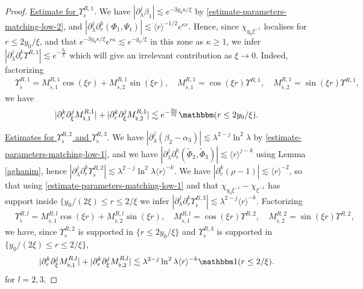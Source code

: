 \documentclass[11 pt]{amsart}
\theoremstyle{definition}
\theoremstyle{remark}
\numberwithin{equation}{section}
\begin{document}
\begin{proof}
\noindent \underline{Estimate for $\Upsilon_\flat^{R,1}$}. We have $|\partial_\lambda^j \beta_1 |\lesssim e^{- 3y_0\kappa /\xi}$ by \eqref{estimate-parameters-matching-low-2}, and $|\partial_\lambda^j \partial_r^k (\Phi_1,\Psi_1)|\lesssim \langle r \rangle^{-1/2}e^{\kappa r}$. Hence, since $\chi_{y_0\xi^{-1}}$ localises for $r\leq 2y_0/\xi$, and that $e^{-3y_0\kappa/\xi}e^{r\kappa}\lesssim e^{-y_0/\xi}$ in this zone as $\kappa\geq 1$, we infer $ \left|\partial_\lambda^j \partial_r^k \Upsilon^{R,1}\right|\lesssim e^{-\frac{y_0}{\xi}} $ which will give an irrelevant contribution as $\xi\to 0$. Indeed, factorizing
\begin{align*}
& \Upsilon^{R,1}_\flat=M^{R,1}_{\flat,1}\cos(\xi r)+M^{R,1}_{\flat,2}\sin(\xi r) , \quad M^{R,1}_{\flat,1}= \cos(\xi r)\Upsilon^{R,1}, \quad M^{R,1}_{\flat,2}= \sin(\xi r)\Upsilon^{R,1}, 
\end{align*}
we have
\begin{equation} \label{bd:mflat-inter-1}
|\partial_r^k \partial_\xi^j M^{R,1}_{\flat,1}|+|\partial_r^k \partial_\xi^j M^{R,1}_{\flat,2}|\lesssim e^{-\frac{y_0}{2\xi}}\mathbbm (r\leq 2y_0/\xi).
\end{equation}

\smallskip
     
\noindent \underline{Estimates for $\Upsilon_\flat^{R,2}$ and $\Upsilon_\flat^{R,3}$}. We have $|\partial_\lambda^j (\beta_2-\alpha_3) |\lesssim \lambda^{2-j} \ln^2 \lambda$ by \eqref{estimate-parameters-matching-low-1}, and we have $|\partial_\lambda^j \partial_r^k (\widetilde \Phi_2,\widetilde \Phi_3)|\lesssim \langle r\rangle^{j-k}$ using Lemma \ref{aghanim}, hence $|\partial_\lambda^j \partial_r^k \Upsilon^{R,2}_\flat|\lesssim \lambda^{2-j}\ln^2 \lambda \langle r\rangle^{-k}$. We have $|\partial_r^k(\rho-1)|\lesssim \langle r\rangle^{-2}$, so that using \eqref{estimate-parameters-matching-low-1} and that $\chi_{y_0\xi^{-1}}-\chi_{\xi^{-1}}$ has support inside $\{ y_0/(2\xi)\leq r \leq 2/\xi$ we infer $|\partial_\lambda^j \partial_r^k \Upsilon^{R,3}_\flat|\lesssim \lambda^{2-j} \langle r\rangle^{-k}$. Factorizing
\begin{align*}
& \Upsilon^{R,l}_\flat=M^{R,l}_{\flat,1}\cos(\xi r)+M^{R,l}_{\flat,2}\sin(\xi r), \quad M^{R,l}_{\flat,1}= \cos(\xi r)\Upsilon^{R,2}, \quad M^{R,2}_{\flat,2}= \sin(\xi r)\Upsilon^{R,2}, 
\end{align*}
we have, since $\Upsilon^{R,2}_\flat$ is supported in $\{r\leq 2y_0/\xi\}$ and $\Upsilon^{R,3}_\flat$ is supported in $\{y_0/(2\xi)\leq r\leq 2/\xi\}$,
\begin{equation} \label{bd:mflat-inter-2}
|\partial_r^k \partial_\xi^j M^{R,l}_{\flat,1}|+|\partial_r^k \partial_\xi^j M^{R,l}_{\flat,2}|\lesssim \lambda^{2-j} \ln^2 \lambda \langle r\rangle^{-k}\mathbbm 1 (r\leq 2/\xi).
\end{equation}
for $l=2,3$.


\end{proof}
\end{document}
